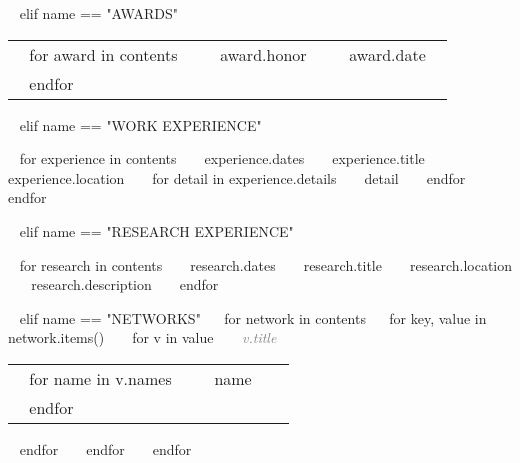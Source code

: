 \begin{minipage}{\textwidth}
~{ elif name == "AWARDS" }~

\begin{tabular}{ p{} %
                   p{} 
                   p{}} %
  ~{ for award in contents }~
  \small\textcolor{gray}{{\emph{  }}} & ~{{ award.honor }}~ & {\hfill \small{~{{ award.date }}~}}\\
  ~{ endfor }~
\end{tabular}


~{ elif name == "WORK EXPERIENCE" }~
\begin{entrylist}
~{ for experience in contents }~
  \entry
    {~{{ experience.dates }}~}
    {~{{ experience.title }}~}
    {~{{ experience.location }}~}
    {~{ for detail in experience.details }~ ~{{ detail }}~ ~{ endfor }~}
~{ endfor }~
\end{entrylist}
  


~{ elif name == "RESEARCH EXPERIENCE" }~
\begin{entrylist}
~{ for research in contents }~
  \entry
    {~{{ research.dates }}~}
    {~{{ research.title }}~}
    {~{{ research.location }}~}
    {~{{ research.description }}~}
~{ endfor }~
\end{entrylist}

% 

~{ elif name == "NETWORKS" }~
~{for network in contents}~
  ~{ for key, value in network.items() }~
    ~{ for v in value }~
       \textcolor{gray}{{\emph{~{{ v.title }}~}}} 
       \begin{tabular}{ p{} %
                        p{} 
                        p{}} %
      ~{ for name in v.names }~ 
      \small &  ~{{ name }}~ & {\hfill}\\ 
      ~{ endfor }~
      \end{tabular}
    ~{ endfor }~
  ~{ endfor }~
~{ endfor }~ 



\end{minipage}
